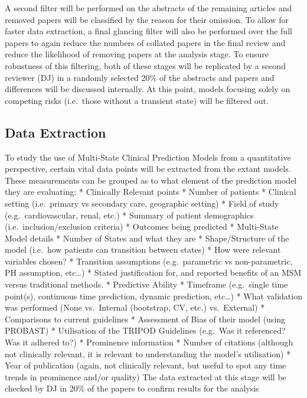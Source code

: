 \documentclass[12pt,PhD,twoside,openright]{muthesis}
\begin{document}
A second filter will be performed on the abstracts of the remaining articles and removed papers will be classified by the reason for their omission. To allow for faster data extraction, a final glancing filter will also be performed over the full papers to again reduce the numbers of collated papers in the final review and reduce the likelihood of removing papers at the analysis stage. To ensure robustness of this filtering, both of these stages will be replicated by a second reviewer (DJ) in a randomly selected 20\% of the abstracts and papers and differences will be discussed internally. At this point, models focusing solely on competing risks (i.e.~those without a transient state) will be filtered out.

\hypertarget{data-extraction}{%
\subsection{Data Extraction}\label{data-extraction}}

To study the use of Multi-State Clinical Prediction Models from a quantitative perspective, certain vital data points will be extracted from the extant models. These measurements can be grouped as to what element of the prediction model they are evaluating:
* Clinically Relevant points
* Number of patients
* Clinical setting (i.e.~primary vs secondary care, geographic setting)
* Field of study (e.g.~cardiovascular, renal, etc.)
* Summary of patient demographics (i.e.~inclusion/exclusion criteria)
* Outcomes being predicted
* Multi-State Model details
* Number of States and what they are
* Shape/Structure of the model (i.e.~how patients can transition between states)
* How were relevant variables chosen?
* Transition assumptions (e.g.~parametric vs non-parametric, PH assumption, etc\ldots)
* Stated justification for, and reported benefits of an MSM versus traditional methods.
* Predictive Ability
* Timeframe (e.g.~single time point(s), continuous time prediction, dynamic prediction, etc\ldots)
* What validation was performed (None vs.~Internal (bootstrap, CV, etc.) vs.~External)
* Comparisons to current guidelines
* Assessment of Bias of their model (using PROBAST)
* Utilisation of the TRIPOD Guidelines (e.g.~Was it referenced? Was it adhered to?)
* Prominence information
* Number of citations (although not clinically relevant, it is relevant to understanding the model's utilisation)
* Year of publication (again, not clinically relevant, but useful to spot any time trends in prominence and/or quality)
The data extracted at this stage will be checked by DJ in 20\% of the papers to confirm results for the analysis
\end{document}
